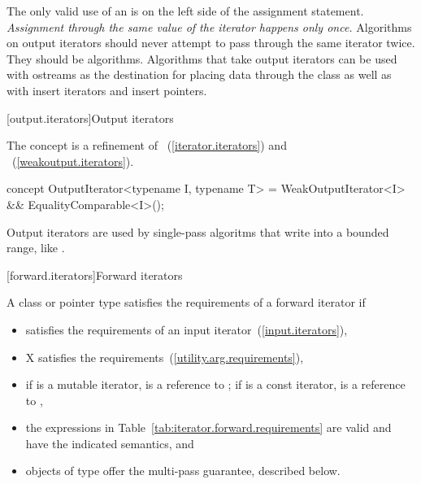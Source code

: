 \pnum
\enternote
The only valid use of an
is on the left side of the assignment statement.
\textit{Assignment through the same value of the iterator happens only once.}
Algorithms on output iterators should never attempt to pass through the same iterator twice.
They should be
algorithms.
Algorithms that take output iterators can be used with ostreams as the destination
for placing data through the
class as well as with insert iterators and insert pointers.
\exitnote

\begin{addedblock}
[output.iterators]{Output iterators}

\pnum
The  concept is a refinement of ~(\ref{iterator.iterators}) and
~(\ref{weakoutput.iterators}).

\begin{codeblock}
concept OutputIterator<typename I, typename T> =
    WeakOutputIterator<I> && EqualityComparable<I>();
\end{codeblock}

\pnum
\enternote Output iterators are used by single-pass
algoritms that write into a bounded range, like .
\exitnote

\end{addedblock}

[forward.iterators]{Forward iterators}

\begin{removedblock}
\pnum
A class or pointer type
satisfies the requirements of a forward iterator if

\begin{itemize}
\item {} satisfies the requirements of an input iterator~(\ref{input.iterators}),

\item X satisfies the 
requirements~(\ref{utility.arg.requirements}),

\item if  is a mutable iterator,  is a reference to ;
if  is a const iterator,  is a reference to ,

\item the expressions in Table~\ref{tab:iterator.forward.requirements}
are valid and have the indicated semantics, and

\item objects of type  offer the multi-pass guarantee, described below.
\end{itemize}
\end{removedblock}

